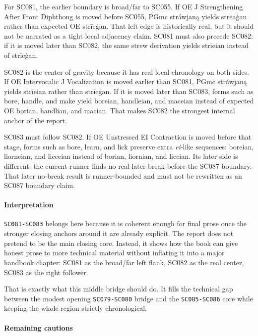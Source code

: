 \documentclass[
  british,
  a4paper,
]{article}
\begin{document}
For SC081, the earlier boundary is broad/far to SC055. If OE J
Strengthening After Front Diphthong is moved before SC055, PGmc
stráwjaną yields strēaġan rather than expected OE strīeġan. That left
edge is historically real, but it should not be narrated as a tight
local adjacency claim. SC081 must also precede SC082: if it is moved
later than SC082, the same strew derivation yields strīeian instead of
strīeġan.

SC082 is the center of gravity because it has real local chronology on
both sides. If OE Intervocalic J Vocalization is moved earlier than
SC081, PGmc stráwjaną yields strīeian rather than strīeġan. If it is
moved later than SC083, forms such as bore, handle, and make yield
boreian, handleian, and maceian instead of expected OE borian, handlian,
and macian. That makes SC082 the strongest internal anchor of the
report.

SC083 must follow SC082. If OE Unstressed EI Contraction is moved before
that stage, forms such as bore, learn, and lick preserve extra
\emph{ei}-like sequences: boreian, liorneian, and licceian instead of
borian, liornian, and liccian. Its later side is different: the current
runner finds no real later break before the SC087 boundary. That later
no-break result is runner-bounded and must not be rewritten as an SC087
boundary claim.

\paragraph{Interpretation}\label{interpretation-50}

\texttt{SC081-SC083} belongs here because it is coherent enough for
final prose once the stronger closing anchors around it are already
explicit. The report does not pretend to be the main closing core.
Instead, it shows how the book can give honest prose to more technical
material without inflating it into a major handbook chapter: SC081 as
the broad/far left flank, SC082 as the real center, SC083 as the right
follower.

That is exactly what this middle bridge should do. It fills the
technical gap between the modest opening \texttt{SC079-SC080} bridge and
the \texttt{SC085-SC086} core while keeping the whole region strictly
chronological.

\paragraph{Remaining cautions}\label{remaining-cautions-50}
\end{document}
